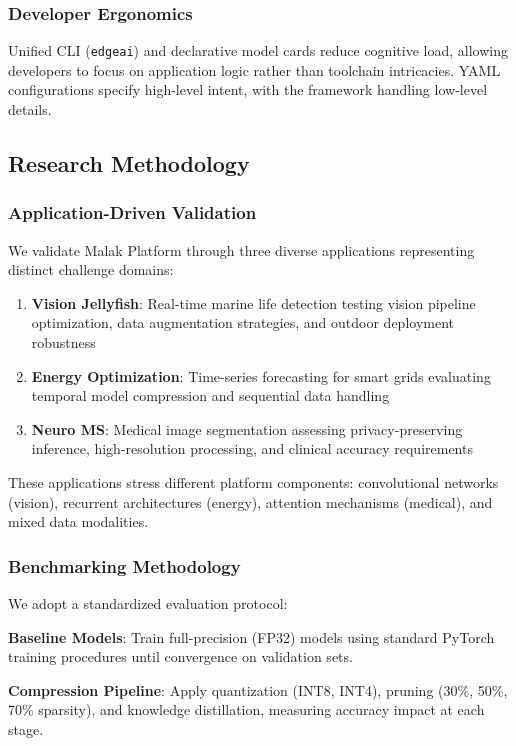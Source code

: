 \subsubsection{Developer Ergonomics}
Unified CLI (\texttt{edgeai}) and declarative model cards reduce cognitive load, allowing developers to focus on application logic rather than toolchain intricacies. YAML configurations specify high-level intent, with the framework handling low-level details.

\subsection{Research Methodology}

\subsubsection{Application-Driven Validation}
We validate Malak Platform through three diverse applications representing distinct challenge domains:

\begin{enumerate}
\item \textbf{Vision Jellyfish}: Real-time marine life detection testing vision pipeline optimization, data augmentation strategies, and outdoor deployment robustness
\item \textbf{Energy Optimization}: Time-series forecasting for smart grids evaluating temporal model compression and sequential data handling
\item \textbf{Neuro MS}: Medical image segmentation assessing privacy-preserving inference, high-resolution processing, and clinical accuracy requirements
\end{enumerate}

These applications stress different platform components: convolutional networks (vision), recurrent architectures (energy), attention mechanisms (medical), and mixed data modalities.

\subsubsection{Benchmarking Methodology}
We adopt a standardized evaluation protocol:

\textbf{Baseline Models}: Train full-precision (FP32) models using standard PyTorch training procedures until convergence on validation sets.

\textbf{Compression Pipeline}: Apply quantization (INT8, INT4), pruning (30\%, 50\%, 70\% sparsity), and knowledge distillation, measuring accuracy impact at each stage.

